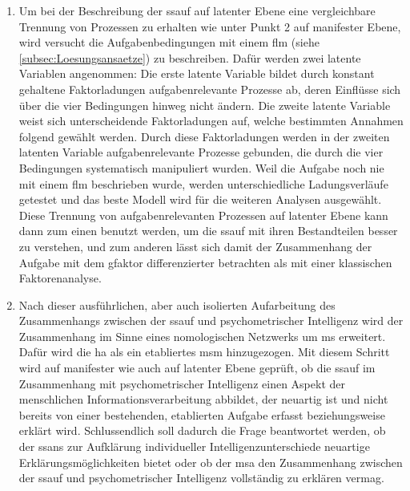 \documentclass[11pt, twoside, a4paper]{book}		%
\begin{document}
\begin{enumerate}
	\item Um bei der Beschreibung der \gls{ssauf} auf latenter Ebene eine vergleichbare Trennung von Prozessen zu erhalten wie unter Punkt 2 auf manifester Ebene, wird versucht die Aufgabenbedingungen mit einem \gls{flm} (siehe \autoref{subsec:Loesungsansaetze}) zu beschreiben. 
	Dafür werden zwei latente Variablen angenommen: Die erste latente Variable bildet durch konstant gehaltene Faktorladungen aufgabenrelevante Prozesse ab, deren Einflüsse sich über die vier Bedingungen hinweg nicht ändern. 
	Die zweite latente Variable weist sich unterscheidende Faktorladungen auf, welche  bestimmten Annahmen folgend gewählt werden.
	Durch diese Faktorladungen werden in der zweiten latenten Variable aufgabenrelevante Prozesse gebunden, die durch die vier Bedingungen systematisch manipuliert wurden. Weil die Aufgabe noch nie mit einem \gls{flm} beschrieben wurde, werden unterschiedliche Ladungsverläufe getestet und das beste Modell wird für die weiteren Analysen ausgewählt.
	Diese Trennung von aufgabenrelevanten Prozessen auf latenter Ebene kann dann zum einen benutzt werden, um die \gls{ssauf} mit ihren Bestandteilen besser zu verstehen, und zum anderen lässt sich damit der Zusammenhang der Aufgabe mit dem \gls{gfaktor} differenzierter betrachten als mit einer klassischen Faktorenanalyse.

	\item Nach dieser ausführlichen, aber auch isolierten Aufarbeitung des Zusammenhangs zwischen der \gls{ssauf} und psychometrischer Intelligenz wird der Zusammenhang im Sinne eines nomologischen Netzwerks \citep{Cronbach1955} um \gls{ms} erweitert. Dafür wird die \gls{ha} als ein etabliertes \gls{msm} hinzugezogen. 
	Mit diesem Schritt wird auf manifester wie auch auf latenter Ebene geprüft, ob die \gls{ssauf} im Zusammenhang mit psychometrischer Intelligenz einen Aspekt der menschlichen Informationsverarbeitung abbildet, der neuartig ist und nicht bereits von einer bestehenden, etablierten Aufgabe erfasst beziehungsweise erklärt wird. Schlussendlich soll dadurch die Frage beantwortet werden, ob der \gls{ssans} zur Aufklärung individueller Intelligenzunterschiede neuartige Erklärungsmöglichkeiten bietet oder ob der \gls{msa} den Zusammenhang zwischen der \gls{ssauf} und psychometrischer Intelligenz vollständig zu erklären vermag. 

\end{enumerate}
\end{document}

